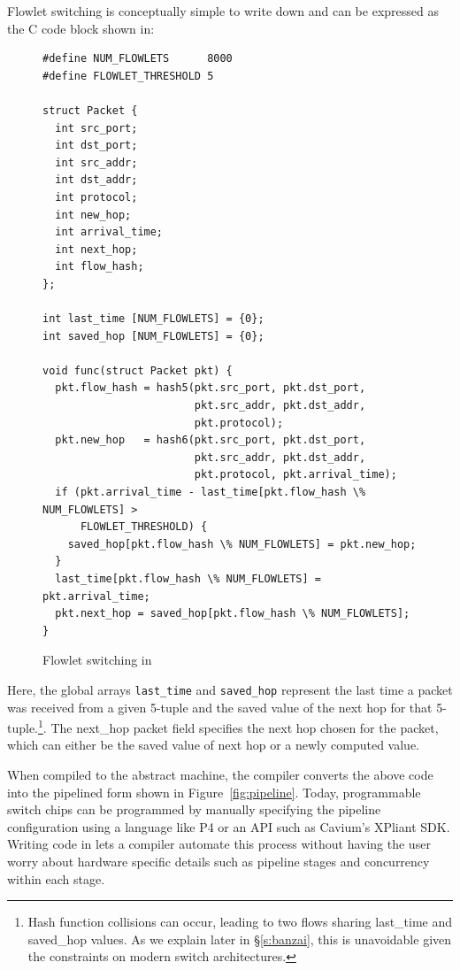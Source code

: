 Flowlet switching is conceptually simple to write down and can be expressed
as the C code block shown in:
\begin{figure}
\begin{small}
\begin{lstlisting}
#define NUM_FLOWLETS      8000
#define FLOWLET_THRESHOLD 5

struct Packet {
  int src_port;
  int dst_port;
  int src_addr;
  int dst_addr;
  int protocol;
  int new_hop;
  int arrival_time;
  int next_hop;
  int flow_hash;
};

int last_time [NUM_FLOWLETS] = {0};
int saved_hop [NUM_FLOWLETS] = {0};

void func(struct Packet pkt) {
  pkt.flow_hash = hash5(pkt.src_port, pkt.dst_port,
                        pkt.src_addr, pkt.dst_addr,
                        pkt.protocol);
  pkt.new_hop   = hash6(pkt.src_port, pkt.dst_port,
                        pkt.src_addr, pkt.dst_addr,
                        pkt.protocol, pkt.arrival_time);
  if (pkt.arrival_time - last_time[pkt.flow_hash \% NUM_FLOWLETS] >
      FLOWLET_THRESHOLD) {
    saved_hop[pkt.flow_hash \% NUM_FLOWLETS] = pkt.new_hop;
  }
  last_time[pkt.flow_hash \% NUM_FLOWLETS] = pkt.arrival_time;
  pkt.next_hop = saved_hop[pkt.flow_hash \% NUM_FLOWLETS];
}
\end{lstlisting}
\end{small}
\label{fig:flowlet}
\caption{Flowlet switching in \pktlanguage}
\end{figure}


Here, the global arrays \texttt{last\_time} and \texttt{saved\_hop} represent
the last time a packet was received from a given 5-tuple and the saved value of
the next hop for that 5-tuple.\footnote{Hash function collisions can occur,
  leading to two flows sharing last\_time and saved\_hop values. As we explain
later in \S\ref{s:banzai}, this is unavoidable given the constraints on modern
switch architectures.}. The next\_hop packet field specifies the next hop
chosen for the packet, which can either be the saved value of next hop or a
newly computed value.

When compiled to the \absmachine abstract machine, the \pktlanguage compiler
converts the above code into the pipelined form shown in
Figure~\ref{fig:pipeline}. Today, programmable switch chips can be programmed
by manually specifying the pipeline configuration using a language like P4 or
an API such as Cavium's XPliant SDK. Writing code in \pktlanguage lets a
compiler automate this process without having the user worry about hardware
specific details such as pipeline stages and concurrency within each stage.


